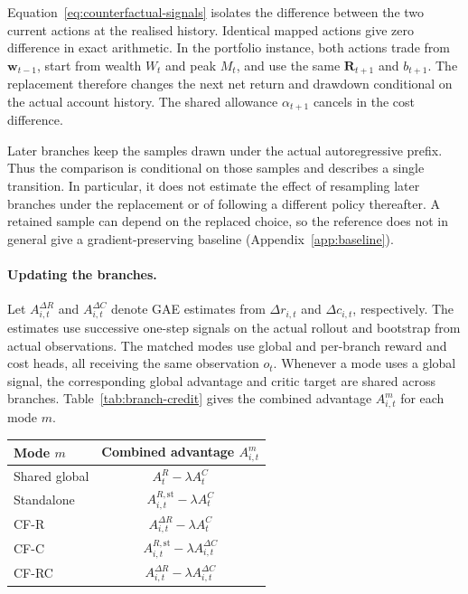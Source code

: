 \documentclass[10pt]{article}
\begin{document}
Equation~\eqref{eq:counterfactual-signals} isolates the difference between the two current actions at the realised history. Identical mapped actions give zero difference in exact arithmetic. In the portfolio instance, both actions trade from $\bm w_{t-1}$, start from wealth $W_t$ and peak $M_t$, and use the same $\bm R_{t+1}$ and $b_{t+1}$. The replacement therefore changes the next net return and drawdown conditional on the actual account history. The shared allowance $\alpha_{t+1}$ cancels in the cost difference.

Later branches keep the samples drawn under the actual autoregressive prefix. Thus the comparison is conditional on those samples and describes a single transition. In particular, it does not estimate the effect of resampling later branches under the replacement or of following a different policy thereafter. A retained sample can depend on the replaced choice, so the reference does not in general give a gradient-preserving baseline (Appendix~\ref{app:baseline}).

\paragraph{Updating the branches.}
Let $A_{i,t}^{\Delta R}$ and $A_{i,t}^{\Delta C}$ denote GAE estimates from $\Delta r_{i,t}$ and $\Delta c_{i,t}$, respectively. The estimates use successive one-step signals on the actual rollout and bootstrap from actual observations. The matched modes use global and per-branch reward and cost heads, all receiving the same observation $o_t$. Whenever a mode uses a global signal, the corresponding global advantage and critic target are shared across branches. Table~\ref{tab:branch-credit} gives the combined advantage $A_{i,t}^{m}$ for each mode $m$.

\begin{center}
\begin{minipage}{\linewidth}
\centering
{}
\label{tab:branch-credit}
\begin{tabular}{@{}lc@{}}
\toprule
Mode $m$ & Combined advantage $A_{i,t}^{m}$ \\
\midrule
Shared global & $A_t^R-\lambda A_t^C$ \\
Standalone & $A_{i,t}^{R,\mathrm{st}}-\lambda A_t^C$ \\
CF-R & $A_{i,t}^{\Delta R}-\lambda A_t^C$ \\
CF-C & $A_{i,t}^{R,\mathrm{st}}-\lambda A_{i,t}^{\Delta C}$ \\
CF-RC & $A_{i,t}^{\Delta R}-\lambda A_{i,t}^{\Delta C}$ \\
\bottomrule
\end{tabular}
\end{minipage}
\end{center}
\end{document}
